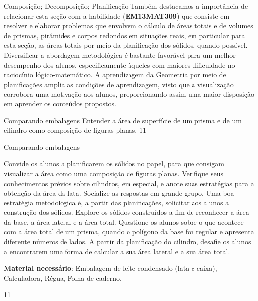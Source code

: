 \begin{paginatexto}{Composição; Decomposição; Planificação}
{Também destacamos a importância de relacionar esta seção com a habilidade (\textbf{EM13MAT309}) que consiste em resolver e elaborar problemas que envolvem o cálculo de áreas totais e de volumes de prismas, pirâmides e corpos redondos em situações reais, em particular para esta seção, as áreas totais por meio da planificação dos sólidos, quando possível.
Diversificar a abordagem metodológica é bastante favorável para um melhor desempenho dos alunos, especificamente àqueles com maiores dificuldade no raciocínio lógico-matemático. A aprendizagem da Geometria por meio de planificações amplia as condições de aprendizagem, visto que a visualização corrobora uma motivação aos alunos, proporcionando assim uma maior disposição em aprender os conteúdos propostos.
}
\end{paginatexto}

\cleardoublepage
\def\currentcolor{session1}
\begin{objectives}{Comparando embalagens}
{
Entender a área de superfície de um prisma e de um cilindro como composição de figuras planas. 
}{1}{1}
\end{objectives}
\begin{sugestions}{Comparando embalagens}
{
Convide os alunos a planificarem os sólidos no papel, para que consigam visualizar a área como uma composição de figuras planas. Verifique seus conhecimentos prévios sobre cilindros, em especial, e anote suas estratégias para a obtenção da área da lata. Socialize as respostas em grande grupo. Uma boa estratégia metodológica é, a partir das planificações, solicitar aos alunos a construção dos sólidos. Explore os sólidos construídos a fim de reconhecer a área da base, a área lateral e a área total. Questione os alunos sobre o que acontece com a área total de um prisma, quando o polígono da base for regular e apresenta diferente números de lados. A partir da planificação do cilindro, desafie os alunos a encontrarem uma forma de calcular a sua área lateral e a sua área total.

\textbf{Material necessário}: Embalagem de leite condensado (lata e caixa), Calculadora, Régua, Folha de caderno.

}{1}{1}
\end{sugestions}
